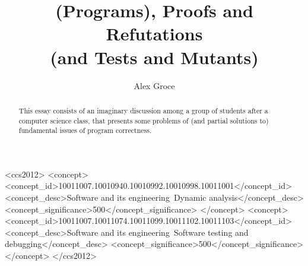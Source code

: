 \documentclass[sigplan]{acmart}
\begin{document}
\title{(Programs), Proofs and Refutations\\(and Tests and Mutants)}

\author{Alex Groce}


\renewcommand{\shortauthors}{Alex Groce}

\begin{abstract}

\end{abstract}

\begin{CCSXML}
<ccs2012>
<concept>
<concept_id>10011007.10010940.10010992.10010998.10011001</concept_id>
<concept_desc>Software and its engineering~Dynamic analysis</concept_desc>
<concept_significance>500</concept_significance>
</concept>
<concept>
<concept_id>10011007.10011074.10011099.10011102.10011103</concept_id>
<concept_desc>Software and its engineering~Software testing and debugging</concept_desc>
<concept_significance>500</concept_significance>
</concept>
</ccs2012>
\end{CCSXML}





\begin{abstract}
This essay consists of an imaginary discussion among a group of
  students after a computer science class, that presents some problems of
  (and partial solutions to) fundamental issues of program
  correctness.
  \end{abstract}
\end{document}
